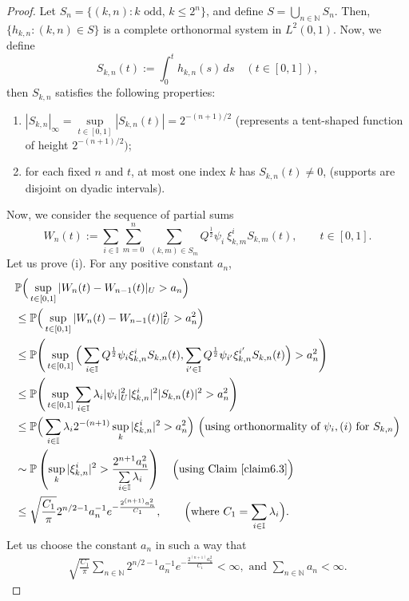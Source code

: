 \documentclass[english,a4paper,11pt]{amsart}
\theoremstyle{plain}
\theoremstyle{definition}
\theoremstyle{remark}
\numberwithin{equation}{section}
\newcommand{\N}{\mathbb{N}}
\renewcommand{\P}{\mathbb{P}}
\begin{document}
\begin{appendix}
\begin{proof}
Let $S_n=\{(k,n): k \text{ odd, } k\leq 2^n\}$, and define $S=\bigcup\limits_{n\in\N}S_n$. Then, $\{h_{k,n}:(k,n)\in S\}$ is a complete orthonormal system in $L^2(0,1)$. Now, we define
	\[
S_{k,n}(t):=\int_0^t h_{k,n}(s)\,ds\quad (t\in[0,1]),
\] then $S_{k,n}$ satisfies the following properties:
\begin{enumerate}
	\item $|S_{k,n}|_\infty=\sup\limits_{t\in[0,1]}|S_{k,n}(t)|=2^{-(n+1)/2}$ (represents a tent-shaped function of height $2^{-(n+1)/2})$;
	\item for each fixed $n$ and $t$, at most one index $k$ has $S_{k,n}(t)\neq 0$, (supports are disjoint on dyadic intervals).
\end{enumerate}
Now, we consider the sequence of partial sums
\[
W_n(t):=\sum_{i\in\mathbb{I}}\sum_{m=0}^{n}\ \sum_{(k,m)\in S_{m}}Q^\frac{1}{2}\psi_i\ \xi_{k,m}^i S_{k,m}(t),\qquad t\in[0,1].
\]
Let us prove (i). For any positive constant $a_n$, 
\begin{align*}\nonumber
&	\P\Big(\sup_{t\in[0,1]} | W_n(t)-W_{n-1}(t) | _U>a_n\Big)
\\&\nonumber
\leq \P\Big(\sup_{t\in[0,1]} | W_n(t)-W_{n-1}(t) | _U^2>a_n^2\Big)
\\&\nonumber
\leq \P\Bigg(\sup_{t\in[0,1]}\Big(\sum_{i\in\mathbb{I}}Q^\frac{1}{2}\psi_i \xi_{k,n}^iS_{k,n}(t),\sum_{i'\in\mathbb{I}}Q^\frac{1}{2}\psi_{i'} \xi_{k,n}^{i'}S_{k,n}(t)\Big)>a_n^2\Bigg)
\\&\nonumber
\leq \P\Bigg(\sup_{t\in[0,1]}\sum_{i\in\mathbb{I}}\lambda_i  | \psi_i | _U^2 |\xi_{k,n}^i|^2|S_{k,n}(t)|^2>a_n^2\Bigg) 
\\&\nonumber
\leq \P\Big(\sum_{i\in\mathbb{I}}\lambda_i 2^{-(n+1)}\sup_{k}|\xi_{k,n}^i|^2>a_n^2\Big)
 \ \Big(\text{using orthonormality of }\psi_i, (i) \text{ for }S_{k,n}\Big)
\\&
 \sim  \P\left(\sup_{k}|\xi_{k,n}^i|^2>\frac{2^{n+1}a_n^2}{\sum\limits_{i\in\mathbb{I}}\lambda_i }\right)   \quad \Big(\text{using Claim \ref{claim6.3}}\Big)
\\&\nonumber
\leq \sqrt{\frac{C_1}{\pi} }2^{n/2-1}a_n^{-1}e^{-\frac{2^{(n+1)}a_n^2}{C_1}}, \qquad \Big(\text{where }C_1=\sum_{i\in\mathbb{I}}\lambda_i \Big).  \label{}
\end{align*}%
%
Let us choose the constant $a_n$ in such a way that 
{\begin{align}\label{FC}
\sqrt{\frac{C_1}{\pi}}	\sum_{n\in\N}  2^{n/2-1}a_n^{-1}e^{-\frac{2^{(n+1)}a_n^2}{C_1}}<\infty, \text{ and }
	\sum_{n\in\N}a_n<\infty.
\end{align}}

\end{proof}
\end{appendix}
\end{document}
